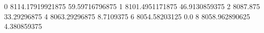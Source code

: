 0 8114.17919921875 59.59716796875
1 8101.4951171875 46.9130859375
2 8087.875 33.29296875
4 8063.29296875 8.7109375
6 8054.58203125 0.0
8 8058.962890625 4.380859375
